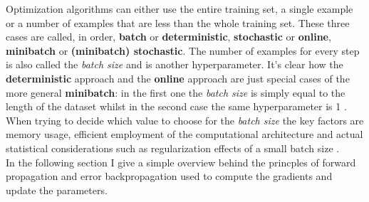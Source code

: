 Optimization algorithms can either use the entire training set, a single example or a number of examples that are less than the whole training set. These three cases are called, in order, \textbf{batch} or \textbf{deterministic}, \textbf{stochastic} or \textbf{online}, \textbf{minibatch} or \textbf{(minibatch) stochastic}. The number of examples for every step is also called the \textit{batch size} and is another hyperparameter. It's clear how the \textbf{deterministic} approach and the \textbf{online} approach are just special cases of the more general \textbf{minibatch}: in the first one the \textit{batch size} is simply equal to the length of the dataset whilst in the second case the same hyperparameter is 1 \citep{Goodfellow2016}. When trying to decide which value to choose for the \textit{batch size} the key factors are memory usage, efficient employment of the computational architecture \citep{Goodfellow2016} and actual statistical considerations such as regularization effects of a small batch size \citep{Wilson2003TheLearning}. \\

In the following section I give a simple overview behind the princples of forward propagation and error backpropagation used to compute the gradients and update the parameters. 
